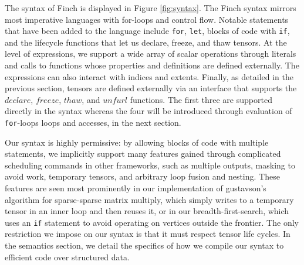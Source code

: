 The syntax of Finch is displayed in Figure \ref{fig:syntax}. The Finch syntax
mirrors most imperative languages with for-loops and control flow. Notable
statements that have been added to the language include \texttt{for},
\texttt{let}, blocks of code with \texttt{if}, and 
the lifecycle functions that let us declare, freeze, and thaw tensors.
%
At the level of expressions, we support a wide array of scalar operations through literals and calls to functions whose properties and definitions are defined externally.
%
The expressions can also interact with indices and extents.
Finally, as detailed in the previous section, tensors are defined externally via an interface that supports the $declare$, $freeze$, $thaw$, and $unfurl$ functions.
%
The first three are supported directly in the syntax whereas the four will be introduced through evaluation of \texttt{for}-loops loops and accesses,
in the next section.
%

Our syntax is highly permissive: by allowing blocks of code with multiple statements, we implicitly support many features gained through complicated scheduling commands in other frameworks, such as multiple outputs, masking to avoid work, temporary tensors, and arbitrary loop fusion and nesting.
%
These features are seen most prominently in our implementation of gustavson's algorithm for sparse-sparse matrix multiply, which simply writes to a temporary tensor in an inner loop and then reuses it, or in our breadth-first-search, which uses an \texttt{if} statement to avoid operating on vertices outside the frontier. 
%
The only restriction we impose on our syntax is that it must respect tensor life cycles.
%
In the semantics section, we detail the specifics of how we compile our syntax to efficient code over structured data.



